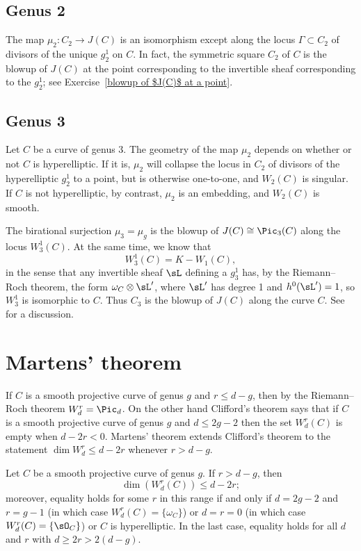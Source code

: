 \subsection*{Genus 2}

The map $\mu_2 : C_{2} \to J(C)$ is an isomorphism except along the
locus $\Gamma \subset  C_{2} $ of divisors of the unique $g^1_2$ on
$C$. In fact, the symmetric square $ C_{2} $ of $C$ is the 
%
blowup of $J(C)$%
at the point corresponding to the invertible sheaf
corresponding to the
$g^1_2$; see Exercise~\ref{blowup of $J(C)$ at a point}.


\subsection*{Genus 3}
Let $C$ be a curve of genus 3. The geometry of the map $\mu_2$
depends on whether or not $C$ is hyperelliptic. If it is, $\mu_2$
will collapse the locus in $C_2$ of divisors of the hyperelliptic
$g^1_2$ to a point, but is otherwise one-to-one, and $W_2(C)$ is
singular.  If $C$ is not hyperelliptic, by contrast, $\mu_2$ is an
embedding, and $W_2(C)$ is smooth.  

\meshing
The birational surjection $\mu_3 = \mu_g$ is the blowup of 
$J(C) \cong \Pic_3(C)$ along the locus $W^1_3(C)$. At the same time, we know
that
$$
W^1_3(C) = K - W_1(C),
$$
in the sense that any invertible sheaf $\sL$ defining a $g^1_3$ has, by the 
%
Riemann--Roch theorem,
the form $\omega_C\otimes \sL'$,
where $\sL'$ has degree 1 and $h^0(\sL') = 1$,
so $W^1_3$ is isomorphic to $C$. Thus $C_{3}$ is the blowup of $J(C)$ along the curve $C$.
See \cite[pp.~53--54]{MumfordCJ} for a discussion.

\section{Martens' theorem}

If $C$ is a smooth projective curve of genus $g$ and $r\leq d-g$, then
by the 
Riemann--Roch theorem
%
 $W^{r}_{d} = \Pic_{d}$. On the other hand
Clifford's theorem
%
says that if $C$ is a smooth projective curve of genus $g$ and $d\leq 2g-2$
  then the set
 $W^r_d(C)$ is empty when $d-2r<0$. Martens' theorem extends Clifford's theorem to the statement
 $\dim W^r_{d} \leq d-2r$ whenever $r>d-g$.
\label{Martens' theorem}%
 
\begin{npt}
\begin{theorem}\label{Martens' inequality}
Let $C$ be a smooth projective curve of genus $g$. If $r > d-g$, then 
$$
\dim(W^r_d(C)) \leq d-2r;
$$
moreover, equality holds for some $r$ in this range if and only if $d=2g-2$ and $r= g-1$ (in which case $W^r_d(C) = \{\omega_C\}$) or
$d=r=0$ (in which case $W^r_d(C) = \{\sO_C\}$) or $C$ is 
hyperelliptic.
%
In the last case, equality holds for all $d$ and $r$ with $d\geq 2r > 2(d-g)$.
\unif
\end{theorem}
\end{npt}

